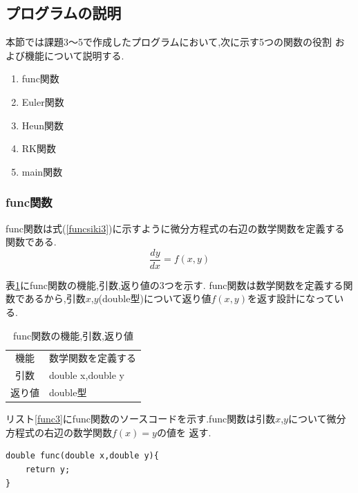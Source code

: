 \documentclass[dvipdfmx]{jarticle}
\begin{document}
    \subsection{プログラムの説明}
    本節では課題3～5で作成したプログラムにおいて,次に示す5つの関数の役割
    および機能について説明する.
    \begin{enumerate}
      \item func関数
      \item Euler関数
      \item Heun関数
      \item RK関数
      \item main関数
      \end{enumerate}

      \subsubsection{func関数}
      func関数は式(\ref{funcsiki3})に示すように微分方程式の右辺の数学関数を定義する関数である.
      \begin{equation}
        \frac{dy}{dx} = f(x,y)
            \label{funcsiki3}
          \end{equation}

      表\ref{func3table}にfunc関数の機能,引数,返り値の3つを示す.
    func関数は数学関数を定義する関数であるから,引数$x$,$y$(double型)について返り値$f(x,y)$を返す設計になっている.

      \begin{table}[H]
      \caption{func関数の機能,引数,返り値}
      \label{func3table}
      \begin{center}
          \begin{tabular}{c|l}\hline
        機能 & 数学関数を定義する\\
        引数 & double x,double y \\
        返り値 & double型 \\ \hline
          \end{tabular}
      \end{center}
      \end{table}
      リスト\ref{func3}にfunc関数のソースコードを示す.func関数は引数$x$,$y$について微分方程式の右辺の数学関数$f(x) = y$の値を
      返す.
      \begin{lstlisting}[basicstyle=\ttfamily\footnotesize, frame=single,label=func3,caption=func関数]
double func(double x,double y){
    return y;
}
      \end{lstlisting}
      
\end{document}
